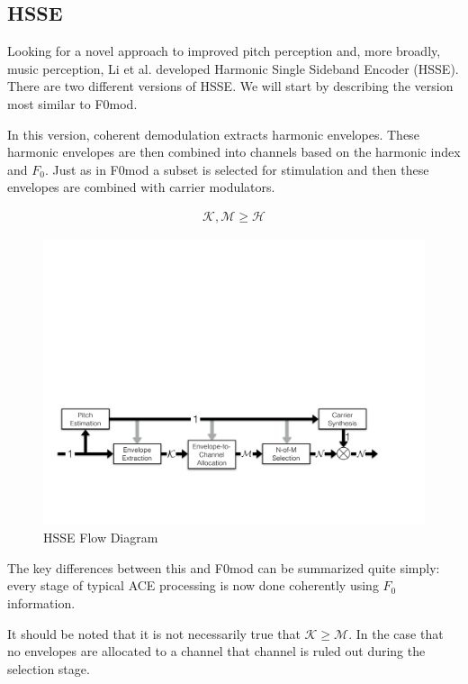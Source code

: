 \documentclass [11pt, proquest,oneside] {ganter_thesis}[2015/03/03]
\begin{document}
\subsection{HSSE}

Looking for a novel approach to improved pitch perception and, more broadly, music perception, Li et al. \cite{li2010harmonic} developed Harmonic Single Sideband Encoder (HSSE).  There are two different versions of HSSE.  We will start by describing the version most similar to F0mod.

In this version, coherent demodulation extracts harmonic envelopes.  These harmonic envelopes are then combined into channels based on the harmonic index and $F_0$.  Just as in F0mod a subset is selected for stimulation and then these envelopes are combined with carrier modulators.

\begin{align}
\mathcal{K}, \mathcal{M} \geq \mathcal{H} \nonumber
\end{align}

\begin{figure}[!ht]
  \centering
    \includegraphics[width=1\textwidth]{HSSE_flow_diagram_noPhase}   
    \caption{HSSE Flow Diagram}\label{fig:HSSE_flow_1}
\end{figure}

The key differences between this and F0mod can be summarized quite simply: every stage of typical ACE processing is now done coherently using $F_0$ information.

It should be noted that it is not necessarily true that $\mathcal{K} \geq \mathcal{M}$.  In the case that no envelopes are allocated to a channel that channel is  ruled out during the selection stage.
\end{document}
